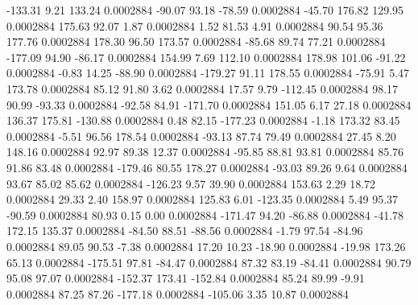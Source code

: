      -133.31        9.21      133.24     0.0002884
      -90.07       93.18      -78.59     0.0002884
      -45.70      176.82      129.95     0.0002884
      175.63       92.07        1.87     0.0002884
        1.52       81.53        4.91     0.0002884
       90.54       95.36      177.76     0.0002884
      178.30       96.50      173.57     0.0002884
      -85.68       89.74       77.21     0.0002884
     -177.09       94.90      -86.17     0.0002884
      154.99        7.69      112.10     0.0002884
      178.98      101.06      -91.22     0.0002884
       -0.83       14.25      -88.90     0.0002884
     -179.27       91.11      178.55     0.0002884
      -75.91        5.47      173.78     0.0002884
       85.12       91.80        3.62     0.0002884
       17.57        9.79     -112.45     0.0002884
       98.17       90.99      -93.33     0.0002884
      -92.58       84.91     -171.70     0.0002884
      151.05        6.17       27.18     0.0002884
      136.37      175.81     -130.88     0.0002884
        0.48       82.15     -177.23     0.0002884
       -1.18      173.32       83.45     0.0002884
       -5.51       96.56      178.54     0.0002884
      -93.13       87.74       79.49     0.0002884
       27.45        8.20      148.16     0.0002884
       92.97       89.38       12.37     0.0002884
      -95.85       88.81       93.81     0.0002884
       85.76       91.86       83.48     0.0002884
     -179.46       80.55      178.27     0.0002884
      -93.03       89.26        9.64     0.0002884
       93.67       85.02       85.62     0.0002884
     -126.23        9.57       39.90     0.0002884
      153.63        2.29       18.72     0.0002884
       29.33        2.40      158.97     0.0002884
      125.83        6.01     -123.35     0.0002884
        5.49       95.37      -90.59     0.0002884
       80.93        0.15        0.00     0.0002884
     -171.47       94.20      -86.88     0.0002884
      -41.78      172.15      135.37     0.0002884
      -84.50       88.51      -88.56     0.0002884
       -1.79       97.54      -84.96     0.0002884
       89.05       90.53       -7.38     0.0002884
       17.20       10.23      -18.90     0.0002884
      -19.98      173.26       65.13     0.0002884
     -175.51       97.81      -84.47     0.0002884
       87.32       83.19      -84.41     0.0002884
       90.79       95.08       97.07     0.0002884
     -152.37      173.41     -152.84     0.0002884
       85.24       89.99       -9.91     0.0002884
       87.25       87.26     -177.18     0.0002884
     -105.06        3.35       10.87     0.0002884
